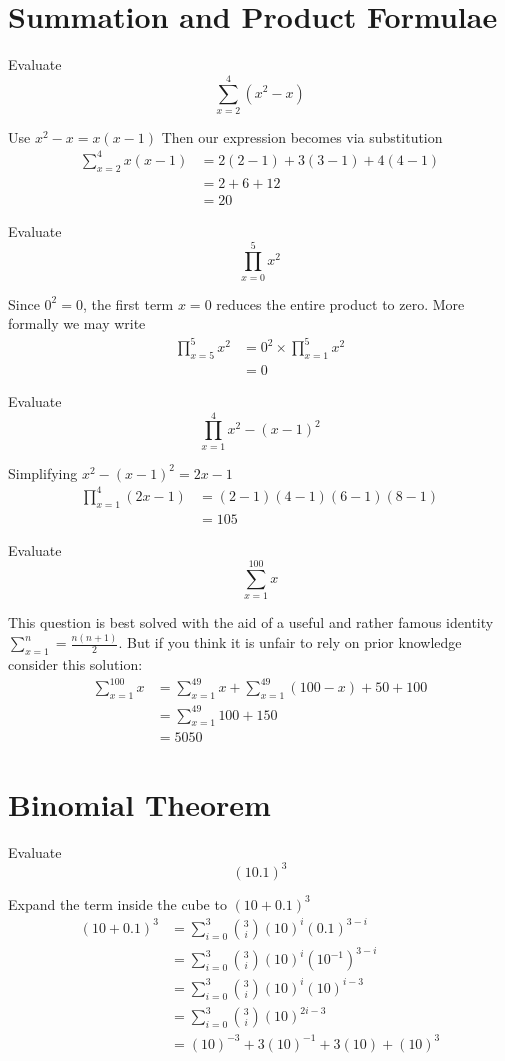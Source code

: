 \documentclass[a4paper]{article}
\begin{document}
\section{Summation and Product Formulae}
\begin{question}{}{}
Evaluate
\[
\sum_{x=2}^4 (x^2-x)
\]
\end{question}
Use \(x^2 -x = x(x-1)\)
Then our expression becomes via substitution
\begin{align*}
\sum_{x=2}^4 x(x-1) &= 2(2-1) + 3(3-1) + 4(4-1) \\
&= 2 + 6 + 12 \\
&=20
\end{align*}

\begin{question}{}{}
Evaluate
\[
\prod_{x=0}^5 x^2
\]
\end{question}
Since \(0^2 = 0\), the first term \(x = 0\) reduces the entire product to zero. More formally we may write
\begin{align*}
\prod_{x=5}^5 x^2 &= 0^2 \times \prod_{x=1}^5x^2 \\ 
&= 0
\end{align*}

\begin{question}{}{}
Evaluate
\[
\prod_{x=1}^{4}x^2-(x-1)^2
\]
\end{question}
Simplifying \(x^2 - (x-1)^2 = 2x -1\)
\begin{align*}
\prod_{x=1}^4 (2x-1) &= (2-1)(4-1)(6-1)(8-1) \\
&=105
\end{align*}

\begin{question}{}{}
Evaluate
\[
\sum_{x=1}^{100} x
\]
\end{question}
This question is best solved with the aid of a useful and rather famous identity \(\sum_{x=1}^n = \frac{n(n+1)}{2}\). But if you think it is unfair to rely on prior knowledge consider this solution:
\begin{align*}
\sum_{x=1}^{100}x &= \sum_{x=1}^{49}x + \sum_{x=1}^{49}(100-x) + 50 + 100 \\
&= \sum_{x=1}^{49}100 + 150 \\
&= 5050
\end{align*}

\section{Binomial Theorem}
\begin{question}{}{}
Evaluate
\[
(10.1)^3
\]
\end{question}
Expand the term inside the cube to \((10+0.1)^3\)
\begin{align*}
(10+0.1)^3 &= \sum_{i=0}^3 {3 \choose i} (10)^i(0.1)^{3-i} \\
&= \sum_{i=0}^3 {3 \choose i}(10)^i(10^{-1})^{3-i} \\
&= \sum_{i=0}^3 {3 \choose i}(10)^i(10)^{i-3} \\
&= \sum_{i=0}^3 {3 \choose i}(10)^{2i-3} \\
&= (10)^{-3} +3(10)^{-1} + 3(10) + (10)^3
\end{align*}
\end{document}
